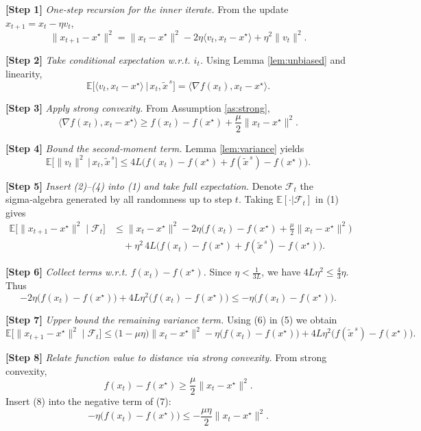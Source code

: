\documentclass[11pt]{article}
\newcommand{\E}{\mathbb{E}}
\begin{document}
\noindent\textbf{[Step 1]} \emph{One‑step recursion for the inner iterate.}  
From the update $x_{t+1}=x_t-\eta v_t$,
\[
\|x_{t+1}-x^{\star}\|^{2}
= \|x_t-x^{\star}\|^{2}-2\eta\langle v_t,x_t-x^{\star}\rangle+\eta^{2}\|v_t\|^{2}.
\tag{1}
\]

\noindent\textbf{[Step 2]} \emph{Take conditional expectation w.r.t. $i_t$.}  
Using Lemma \ref{lem:unbiased} and linearity,
\[
\E\!\big[\langle v_t,x_t-x^{\star}\rangle\,\big|\,x_t,\tilde{x}^{\,s}\big]
= \langle\nabla f(x_t),x_t-x^{\star}\rangle .
\tag{2}
\]

\noindent\textbf{[Step 3]} \emph{Apply strong convexity.}  
From Assumption \ref{as:strong},
\[
\langle\nabla f(x_t),x_t-x^{\star}\rangle\ge f(x_t)-f(x^{\star})+\frac{\mu}{2}\|x_t-x^{\star}\|^{2}.
\tag{3}
\]

\noindent\textbf{[Step 4]} \emph{Bound the second‑moment term.}  
Lemma \ref{lem:variance} yields
\[
\E\!\big[\|v_t\|^{2}\,\big|\,x_t,\tilde{x}^{\,s}\big]
\le 4L\big(f(x_t)-f(x^{\star})+f(\tilde{x}^{\,s})-f(x^{\star})\big).
\tag{4}
\]

\noindent\textbf{[Step 5]} \emph{Insert (2)–(4) into (1) and take full expectation.}  
Denote $\mathcal{F}_t$ the sigma‑algebra generated by all randomness up to step $t$. Taking $\E[\cdot|\mathcal{F}_t]$ in (1) gives
\[
\begin{aligned}
\E\!\big[\|x_{t+1}-x^{\star}\|^{2}\mid\mathcal{F}_t\big]
&\le \|x_t-x^{\star}\|^{2}
      -2\eta\Big(f(x_t)-f(x^{\star})+\frac{\mu}{2}\|x_t-x^{\star}\|^{2}\Big)\\
&\quad +\eta^{2}\,4L\Big(f(x_t)-f(x^{\star})+f(\tilde{x}^{\,s})-f(x^{\star})\Big).
\end{aligned}
\tag{5}
\]

\noindent\textbf{[Step 6]} \emph{Collect terms w.r.t. $f(x_t)-f(x^{\star})$.}  
Since $\eta<\frac{1}{3L}$, we have $4L\eta^{2}\le \frac{4}{3}\eta$. Thus
\[
-2\eta\big(f(x_t)-f(x^{\star})\big)+4L\eta^{2}\big(f(x_t)-f(x^{\star})\big)
\le -\eta\big(f(x_t)-f(x^{\star})\big).
\tag{6}
\]

\noindent\textbf{[Step 7]} \emph{Upper bound the remaining variance term.}  
Using (6) in (5) we obtain
\[
\E\!\big[\|x_{t+1}-x^{\star}\|^{2}\mid\mathcal{F}_t\big]
\le \Big(1-\mu\eta\Big)\|x_t-x^{\star}\|^{2}
      -\eta\big(f(x_t)-f(x^{\star})\big)
      +4L\eta^{2}\big(f(\tilde{x}^{\,s})-f(x^{\star})\big).
\tag{7}
\]

\noindent\textbf{[Step 8]} \emph{Relate function value to distance via strong convexity.}  
From strong convexity,
\[
f(x_t)-f(x^{\star})\ge \frac{\mu}{2}\|x_t-x^{\star}\|^{2}.
\tag{8}
\]
Insert (8) into the negative term of (7):
\[
-\eta\big(f(x_t)-f(x^{\star})\big)\le -\frac{\mu\eta}{2}\|x_t-x^{\star}\|^{2}.
\tag{9}
\]
\end{document}
